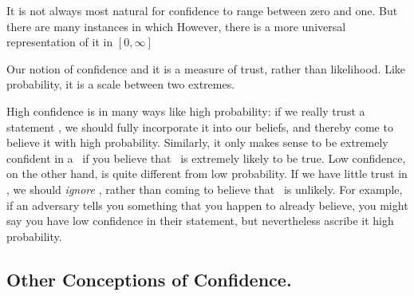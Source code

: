 It is not always most natural for confidence to range between zero and one. 
But there are many instances in which 
However, there is a more universal representation of it in $[0, \infty]$


Our notion of confidence 
and it is a measure of trust, rather than likelihood.
Like probability, it is a scale between two extremes.
%

High confidence is in many ways like high probability: if we really trust a statement \stmt, we should fully incorporate it into our beliefs, and thereby come to believe it with high probability.
Similarly, it only makes sense to be extremely confident in a \stmt\ if you believe that \stmt\ is extremely likely to be true.
Low confidence, on the other hand, is quite different from low probability.
If we have little trust in \stmt, we should \emph{ignore} \stmt, rather than coming to believe that \stmt\ is unlikely.
For example, if an adversary tells you something that you happen to already believe,
you might say you have low confidence in their statement, but nevertheless ascribe it high probability.


\subsection{Other Conceptions of Confidence.}


